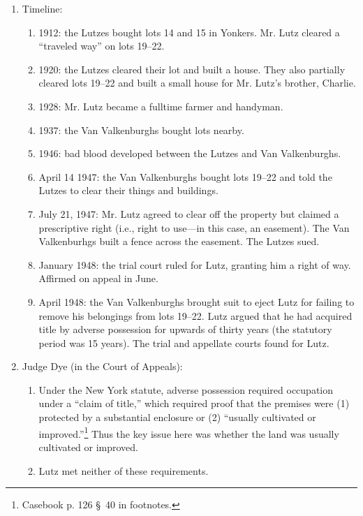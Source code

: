 \begin{enumerate}
    \item Timeline:
    \begin{enumerate}
        \item 1912: the Lutzes bought lots 14 and 15 in Yonkers. Mr. Lutz 
        cleared a ``traveled way'' on lots 19--22.
        \item 1920: the Lutzes cleared their lot and built a house. They also 
        partially cleared lots 19--22 and built a small house for Mr. Lutz's 
        brother, Charlie.
        \item 1928: Mr. Lutz became a fulltime farmer and handyman.
        \item 1937: the Van Valkenburghs bought lots nearby.
        \item 1946: bad blood developed between the Lutzes and Van 
        Valkenburghs.
        \item April 14 1947: the Van Valkenburghs bought lots 19--22 and told the 
        Lutzes to clear their things and buildings.
        \item July 21, 1947: Mr. Lutz agreed to clear off the property but 
        claimed a prescriptive right (i.e., right to use---in this case, an
        easement). The Van Valkenburhgs built a fence across the easement. The 
        Lutzes sued.
        \item January 1948: the trial court ruled for Lutz, granting him a 
        right of way. Affirmed on appeal in June.
        \item April 1948: the Van Valkenburghs brought suit to eject Lutz for 
        failing to remove his belongings from lots 19--22. Lutz argued that he 
        had acquired title by adverse possession for upwards of thirty years 
        (the statutory period was 15 years). The trial and appellate courts 
        found for Lutz.
    \end{enumerate}
    \item Judge Dye (in the Court of Appeals):
    \begin{enumerate}
        \item Under the New York statute, adverse possession required occupation under a ``claim of 
        title,'' which required proof that the premises were (1) protected by a 
        substantial enclosure or (2) ``usually cultivated or 
        improved.''\footnote{Casebook p. 126 \S\ 40 in footnotes.} Thus the 
        key issue here was whether the land was usually cultivated or 
        improved.
        \item Lutz met neither of these requirements.

\end{enumerate}
\end{enumerate}

